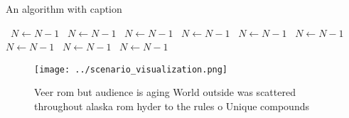 \documentclass[a4paper]{article}
\begin{document}
\begin{algorithm}
\caption{An algorithm with caption}
\begin{algorithmic}
\    \State $N \gets N - 1$
\    \State $N \gets N - 1$
\    \State $N \gets N - 1$
\    \State $N \gets N - 1$
\    \State $N \gets N - 1$
\    \State $N \gets N - 1$
\    \State $N \gets N - 1$
\    \State $N \gets N - 1$
\    \State $N \gets N - 1$
\EndWhile
\end{algorithmic}
\end{algorithm}

\begin{figure}
\centering
\texttt{[image: ../scenario\_visualization.png]}
\caption{Veer rom but audience is aging World outside was scattered throughout alaska rom hyder to the rules o Unique compounds 
}
\end{figure}
 
\end{document}
